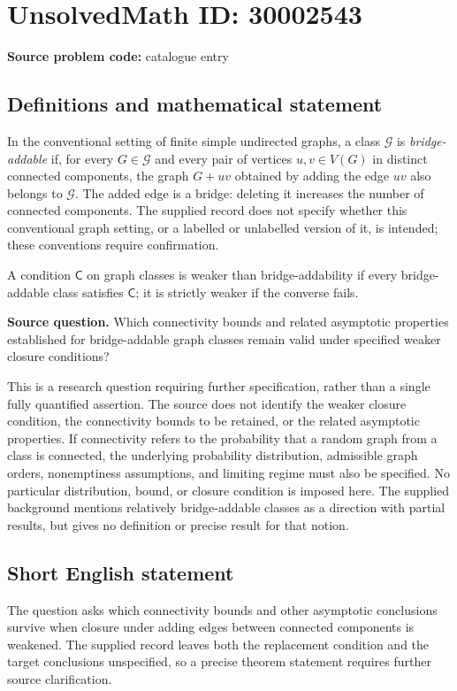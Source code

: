 \documentclass[11pt]{article}
\begin{document}
\section*{UnsolvedMath ID: 30002543}
\textbf{Source problem code:} catalogue entry
\subsection{Definitions and mathematical statement}
In the conventional setting of finite simple undirected graphs, a class \(\mathcal{G}\) is \emph{bridge-addable} if, for every \(G\in\mathcal{G}\) and every pair of vertices \(u,v\in V(G)\) in distinct connected components, the graph \(G+uv\) obtained by adding the edge \(uv\) also belongs to \(\mathcal{G}\). The added edge is a bridge: deleting it increases the number of connected components. The supplied record does not specify whether this conventional graph setting, or a labelled or unlabelled version of it, is intended; these conventions require confirmation.

A condition \(\mathsf{C}\) on graph classes is weaker than bridge-addability if every bridge-addable class satisfies \(\mathsf{C}\); it is strictly weaker if the converse fails.

\textbf{Source question.} Which connectivity bounds and related asymptotic properties established for bridge-addable graph classes remain valid under specified weaker closure conditions?

This is a research question requiring further specification, rather than a single fully quantified assertion. The source does not identify the weaker closure condition, the connectivity bounds to be retained, or the related asymptotic properties. If connectivity refers to the probability that a random graph from a class is connected, the underlying probability distribution, admissible graph orders, nonemptiness assumptions, and limiting regime must also be specified. No particular distribution, bound, or closure condition is imposed here. The supplied background mentions relatively bridge-addable classes as a direction with partial results, but gives no definition or precise result for that notion.
\subsection{Short English statement}
The question asks which connectivity bounds and other asymptotic conclusions survive when closure under adding edges between connected components is weakened. The supplied record leaves both the replacement condition and the target conclusions unspecified, so a precise theorem statement requires further source clarification.
\end{document}
